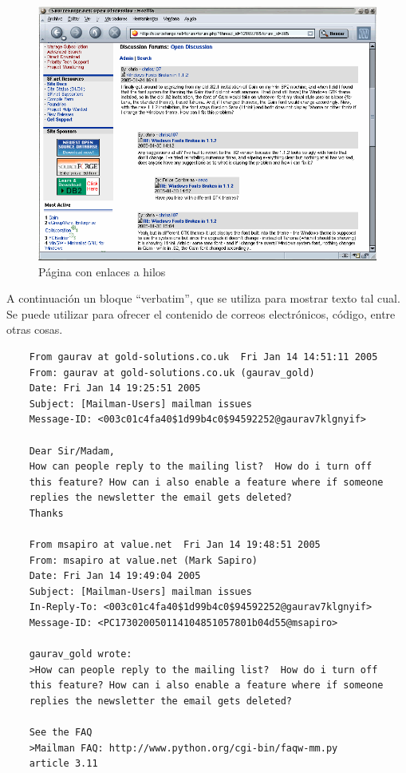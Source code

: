 \documentclass[a4paper, 12pt]{book}
\begin{document}
 \begin{figure}
    \centering
    \includegraphics[bb=0 0 800 600, width=12cm, keepaspectratio]{img/foro1}
    \caption{Página con enlaces a hilos}
    \label{figura:foro_hilos}
 \end{figure}

A continuación un bloque ``verbatim'', que se utiliza para mostrar texto tal cual.
Se puede utilizar para ofrecer el contenido de correos electrónicos, código, entre otras cosas.

{\footnotesize
\begin{verbatim}
    From gaurav at gold-solutions.co.uk  Fri Jan 14 14:51:11 2005
    From: gaurav at gold-solutions.co.uk (gaurav_gold)
    Date: Fri Jan 14 19:25:51 2005
    Subject: [Mailman-Users] mailman issues
    Message-ID: <003c01c4fa40$1d99b4c0$94592252@gaurav7klgnyif>

    Dear Sir/Madam,
    How can people reply to the mailing list?  How do i turn off
    this feature? How can i also enable a feature where if someone
    replies the newsletter the email gets deleted?
    Thanks

    From msapiro at value.net  Fri Jan 14 19:48:51 2005
    From: msapiro at value.net (Mark Sapiro)
    Date: Fri Jan 14 19:49:04 2005
    Subject: [Mailman-Users] mailman issues
    In-Reply-To: <003c01c4fa40$1d99b4c0$94592252@gaurav7klgnyif>
    Message-ID: <PC173020050114104851057801b04d55@msapiro>

    gaurav_gold wrote:
    >How can people reply to the mailing list?  How do i turn off
    this feature? How can i also enable a feature where if someone
    replies the newsletter the email gets deleted?

    See the FAQ
    >Mailman FAQ: http://www.python.org/cgi-bin/faqw-mm.py
    article 3.11
\end{verbatim}
}
\end{document}
